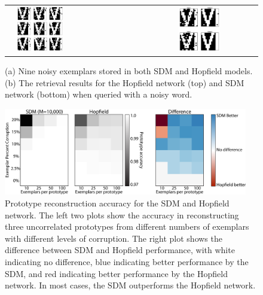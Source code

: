 \documentclass[10pt,letterpaper]{article}
\begin{document}
\begin{figure}[t!]
  \begin{center}
    \begin{tabular}{ l l l c}
      \raisebox{2.5in}{(a)} &
      \includegraphics[width=0.41\textwidth]{./figures/exemplars.png} &
      \raisebox{2.5in}{(b)} &
      \includegraphics[width=0.38\textwidth]{./figures/prototypeResults.png} \\
    \end{tabular}
    \caption{(a) Nine noisy exemplars stored in both SDM and Hopfield
      models. (b) The retrieval results for the Hopfield network (top)
      and SDM network (bottom) when queried with a noisy word.}
    \label{fig:prototypes}
  \end{center}
\end{figure}

\begin{figure}[t!]
  \begin{center}
    \includegraphics[width=0.95\textwidth]{./figures/prototype-edit.png}
  \end{center}
  \caption{Prototype reconstruction accuracy for the SDM and Hopfield
    network. The left two plots show the accuracy in reconstructing
    three uncorrelated prototypes from different numbers of exemplars
    with different levels of corruption. The right plot shows the
    difference between SDM and Hopfield performance, with white
    indicating no difference, blue indicating better performance by
    the SDM, and red indicating better performance by the Hopfield
    network. In most cases, the SDM outperforms the Hopfield network.}
  \label{fig:prototype-comparison}
\end{figure}
\end{document}
